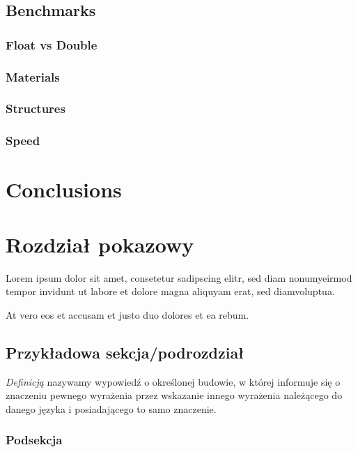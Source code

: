 \documentclass[en]{minipw} %
\begin{document}
\section{Benchmarks}
\subsection{Float vs Double}
\subsection{Materials}
\subsection{Structures}
\subsection{Speed}

\chapter{Conclusions}

\chapter{Rozdział pokazowy}

Lorem ipsum dolor sit amet, consetetur sadipscing elitr, sed diam nonumyeirmod tempor invidunt ut labore et dolore magna aliquyam erat, sed diamvoluptua.

At vero eos et accusam et justo duo dolores et ea rebum.


\section{Przykładowa sekcja/podrozdział}

\begin{definition}[Definicja]
\textit{Definicją} nazywamy wypowiedź o określonej budowie, w której informuje się o znaczeniu pewnego wyrażenia przez wskazanie innego wyrażenia należącego do danego języka i posiadającego to samo znaczenie.
\end{definition}

\subsection{Podsekcja}
\end{document}
